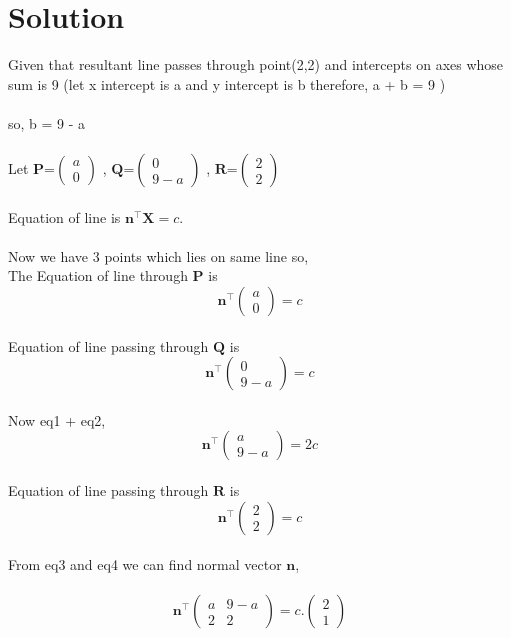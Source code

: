 \documentclass[journal,12pt,twocolumn]{IEEEtran}
\newcommand{\myvec}[1]{\ensuremath{\begin{pmatrix}#1\end{pmatrix}}}
\let\vec\mathbf
\begin{document}
\section{Solution}
Given that resultant line passes through point(2,2) and intercepts on axes whose sum is 9 (let x intercept is a and y intercept is b therefore, a + b = 9 ) \\
\\
so, b = 9 - a  \\
\\
Let ${\vec{P}}$=$\myvec{
  a\\
  0}$
 , ${\vec{Q}}$=$\myvec{
  0\\
  9-a}$
  , ${\vec{R}}$=$\myvec{
  2\\
  2}$
\\
\\
Equation of line is ${\vec{n^{\top}}\vec{X}} = c$.\\
\\
Now we have 3 points which lies on same line so,\\
 The Equation of line through ${\vec{P}}$ is\\
\begin{equation}
	\vec{n^{\top}}
	\myvec{
  a\\
  0}
  = c \label{eq-1}
\end{equation}
\\
Equation of line passing through ${\vec{Q}}$ is\\
\begin{equation}
	\vec{n^{\top}}
     \myvec{
  0\\
  9 - a
 }
  = c \label{eq-2}
\end{equation}
\\
Now eq1 + eq2,\\
\begin{equation}
	\vec{n^{\top}}
	\myvec{
  a\\
  9 - a
}
  = 2c \label{eq-3}
\end{equation}
\\
Equation of line passing through ${\vec{R}}$ is\\
\begin{equation}
	\vec{n^{\top}}
	\myvec{
  2\\
  2}
  = c \label{eq-4}
\end{equation}
 \\
 From eq3 and eq4 we can find normal vector ${\vec{n}}$,\\
 \\
 \begin{equation}
	 \vec{n^{\top}}
	 \myvec{
  a & 9-a\\
  2 & 2
 }
	 = c.\myvec{
  2\\
  1}
 \label{eq-5}
\end{equation}
\end{document}
